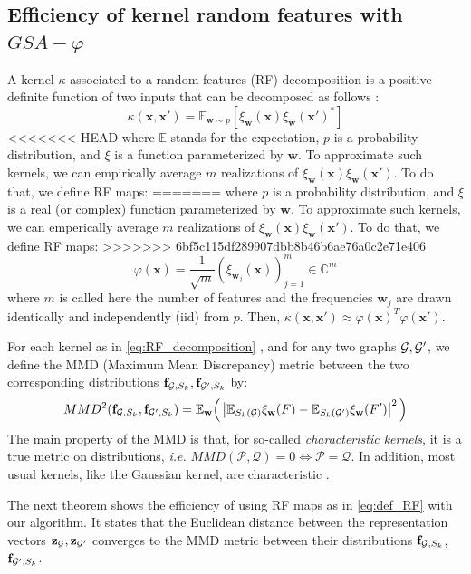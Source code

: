 \documentclass{article}
\begin{document}
\subsection{Efficiency of kernel random features with $GSA-\varphi$} 
\label{sec:MMD}
A kernel $\kappa$ associated to a random features (RF) decomposition is a positive definite function of two inputs that can be decomposed  as follows   \cite{rahimi2008random}:
\begin{equation}
\label{eq:RF_decomposition}
\kappa(\mathbf{x},\mathbf{x}')=\mathbb{E}_{\mathbf{w}\sim p}[ \xi_\mathbf{w}(\mathbf{x}) \xi_\mathbf{w}(\mathbf{x}')^*]
\end{equation}
<<<<<<< HEAD
where $\mathbb{E}$ stands for the expectation, $p$ is a probability distribution, and $\xi$ is a function parameterized by $\mathbf{w}$. 
To approximate such kernels, we can empirically average $m$ realizations of $\xi_\mathbf{w}(\mathbf{x}) \xi_\mathbf{w}(\mathbf{x}')$. To do that, we define RF maps:
=======
where $p$ is a probability distribution, and $\xi$ is a real (or complex) function parameterized by $\mathbf{w}$.
To approximate such kernels, we can emperically average $m$ realizations of $\xi_\mathbf{w}(\mathbf{x}) \xi_\mathbf{w}(\mathbf{x}')$. To do that, we define RF maps:
>>>>>>> 6bf5c115df289907dbb8b46b6ae76a0c2e71e406
\begin{equation}
	\label{eq:def_RF}
	\varphi(\mathbf{x}) = \frac{1}{\sqrt{m}} ( \xi_{\mathbf{w}_j}(\mathbf{x}) )_{j=1}^m \in \mathbb{C}^m
\end{equation}
where  $m$ is called here the number of features and the frequencies $\mathbf{w}_j$ are drawn identically and independently (iid) from $p$. Then, $\kappa(\mathbf{x},\mathbf{x}')\approx	\varphi(\mathbf{x})^T	\varphi(\mathbf{x}')$.

 For each kernel as in  \eqref{eq:RF_decomposition} , and for any two graphs $\mathcal{G},\mathcal{G}'$, we define the MMD (Maximum Mean Discrepancy) metric between the two corresponding distributions  $\mathbf{f}_{\mathcal{G},S_k}, \mathbf{f}_{\mathcal{G}',S_k}$ by:
 \[
 MMD^2(\mathbf{f}_{\mathcal{G},S_k}, \mathbf{f}_{\mathcal{G}',S_k}) = \mathbb{E}_{\mathbf{w}} \Big( \left| \mathbb{E}_{S_k(\mathcal{G})} \xi_\mathbf{w}(F) - \mathbb{E}_{S_k(\mathcal{G}')} \xi_\mathbf{w}(F') \right|^2 \Big)
 \]
 The main property of the MMD is that, for so-called \emph{characteristic kernels}, it is a true metric on distributions, \emph{i.e.} $MMD(\mathcal{P}, \mathcal{Q}) = 0 \Leftrightarrow \mathcal{P} = \mathcal{Q}$. In addition, most usual kernels, like the Gaussian kernel, are characteristic \cite{MMD}.
 
 The next theorem shows the efficiency of using RF maps as in \eqref{eq:def_RF} with our algorithm. It states  that the Euclidean distance between the representation vectors $\mathbf{z}_{\mathcal{G}}, \mathbf{z}_{\mathcal{G}'}$ converges to the MMD metric between their distributions $\mathbf{f}_{\mathcal{G},S_k}$, $\mathbf{f}_{\mathcal{G}',S_k}$. 
\end{document}
